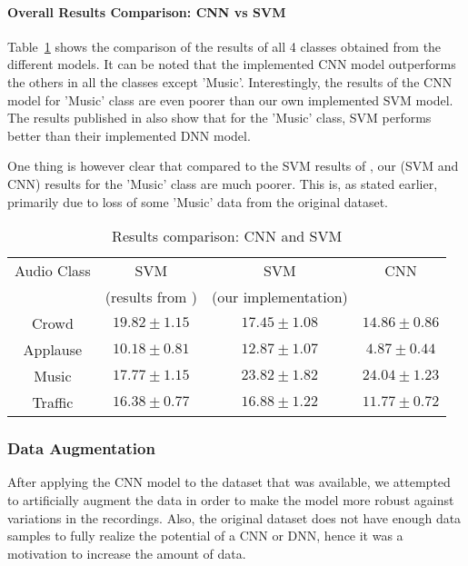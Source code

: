 \paragraph{Overall Results Comparison: CNN vs SVM}

Table~\ref{tab:cnn_db2_overall} shows the comparison of the results of all 4 classes obtained from the different models. It can be noted that the implemented CNN model outperforms the others in all the classes except 'Music'. Interestingly, the results of the CNN model for 'Music' class are even poorer than our own implemented SVM model. The results published in \cite{kons2013audio} also show that for the 'Music' class, SVM performs better than their implemented DNN model. 

One thing is however clear that compared to the SVM results of \cite{kons2013audio}, our (SVM and CNN) results for the 'Music' class are much poorer. This is, as stated earlier, primarily due to loss of some 'Music' data from the original dataset.

\begin{table}[tb]
\caption[Results comparison: CNN and SVM]{Results comparison: CNN and SVM}
\label{tab:cnn_db2_overall}
\centering
\begin{tabular}{cccc}
\toprule
Audio Class & SVM  & SVM & CNN  \\
& (results from \cite{kons2013audio}) & (our implementation) &  \\
\midrule
Crowd	& $19.82 \pm 1.15$  & $17.45 \pm 1.08$ &  $14.86 \pm 0.86$\\
Applause	& $10.18 \pm 0.81$ & $12.87 \pm 1.07$ &  $4.87 \pm 0.44$\\
Music	& $17.77 \pm 1.15$ & $23.82 \pm 1.82$  &  $24.04 \pm 1.23$\\
Traffic	& $16.38 \pm 0.77$ & $16.88 \pm 1.22$  &  $11.77 \pm 0.72$\\
\bottomrule 
\end{tabular}
\end{table}

\subsubsection{Data Augmentation}
After applying the CNN model to the dataset that was available, we attempted to artificially augment the data in order to make the model more robust against variations in the recordings. Also, the original dataset does not have enough data samples to fully realize the potential of a CNN or DNN, hence it was a motivation to increase the amount of data.

